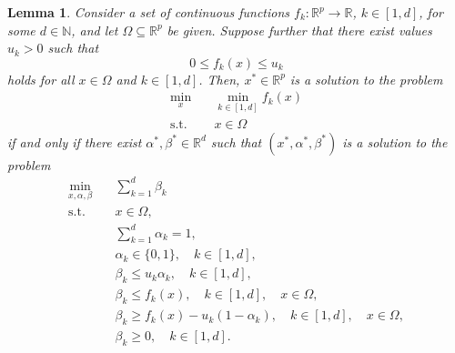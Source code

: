 \documentclass[10pt,a4paper]{amsart}
\newtheorem{lem}{Lemma}
\newcommand{\st}{\text{s.t.}}
\begin{document}
\begin{lem}
  \label{lemma2}
  Consider a set of continuous functions $f_k : \mathbb{R}^p \to
  \mathbb{R}$, $k \in [1,d]$, for some $d\in \mathbb{N}$, and let $\Omega
  \subseteq \mathbb{R}^p$ be given.
  Suppose further that there exist values $u_k>0$ such that $$0
  \leq f_k(x)\leq u_k$$ holds for all $x \in  \Omega$ and $k \in
  [1,d]$.
  Then, $x^*\in \mathbb{R}^p$ is a solution to the problem
  \begin{subequations} \label{problemmain}
    \begin{align}
      \min_{x} \quad
      & \min_{k \in [1,d]} f_k(x)
        \label{eq:problemmain1}\\
      \st \quad
      & x \in \Omega
        \label{eq:problemmain2}
    \end{align}
  \end{subequations}
  if and only if there exist $\alpha^*, \beta^* \in \mathbb{R}^d$ such
  that $(x^*, \alpha^*, \beta^*)$ is a solution to the problem
  \begin{subequations}
    \label{problembeta}
    \begin{align}
      \min_{ x,\alpha,\beta }
      & \quad \sum_{k=1}^d \beta_k
        \label{eq:beta1} \\
      \st
      & \quad x \in  \Omega,
        \label{eq:beta2}  \\
      & \quad  \sum_{k =1}^d \alpha_k = 1,
        \label{eq:beta3} \\
      &  \quad    \alpha_k \in \{0,1\}, \quad k \in[1,d],
        \label{eq:beta4}     \\
      &  \quad    \beta_k\leq u_k\alpha_k, \quad k \in[1,d],
        \label{eq:beta5}   \\
      &  \quad    \beta_k\leq f_k(x), \quad k \in[1,d], \quad x \in
        \Omega ,
        \label{eq:beta6}   \\
      &  \quad   \beta_k\geq f_k(x) - u_k(1-\alpha_k), \quad k
        \in[1,d], \quad x \in  \Omega,
        \label{eq:beta7}   \\
      &  \quad    \beta_k\geq 0, \quad k \in[1,d].
        \label{eq:beta8}
    \end{align}
  \end{subequations}
\end{lem}
\end{document}
